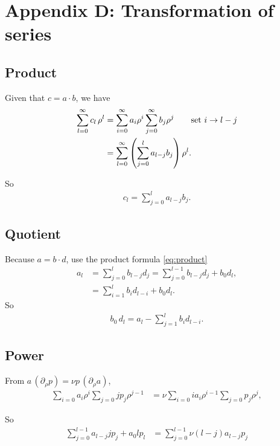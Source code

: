 \documentclass[preprint]{revtex4-1}
\numberwithin{equation}{subsection}
\numberwithin{table}{section}
\begin{document}
\section{Appendix D: Transformation of series}

\subsection{Product}

Given that $c = a \cdot b$, we have
\begin{align*}
  \sum_{l = 0}^{\infty} c_l \, \rho^l
  &=
  \sum_{i = 0}^{\infty} a_i \rho^i
  \sum_{j = 0}^{\infty} b_j \rho^j
  \qquad \mbox{set $i \rightarrow l - j$}
 \notag \\
  &=
  \sum_{l = 0}^{\infty}
  \left(
  \sum_{j = 0}^{l}
    a_{l-j} b_j \right) \rho^l.
\end{align*}

So
\begin{align}
  c_l = \sum_{j = 0}^{l} a_{l-j} b_j.
  \label{eq:product}
\end{align}



\subsection{Quotient}


Because $a = b \cdot d$,
use the product formula \eqref{eq:product}
\begin{align*}
  a_l
  &= \sum_{j = 0}^{l} b_{l-j} d_j
  = \sum_{j = 0}^{l - 1} b_{l - j} d_j + b_0 d_l,
\\
  &= \sum_{i = 1}^{l} b_{i} d_{l - i} + b_0 d_l.
\end{align*}
So
\begin{align*}
  b_0 \, d_l = a_l -\sum_{j = 1}^{l} b_{i} d_{l - i}.
\end{align*}


\subsection{Power}

From $a \, (\partial_\rho p) = \nu p \, (\partial_\rho a)$,
%
\begin{align*}
  \sum_{i = 0} a_i \rho^i
  \sum_{j = 0} j p_j \rho^{j - 1}
&=
  \nu
  \sum_{i = 0} i a_i \rho^{i - 1}
  \sum_{j = 0} p_j \rho^{j},
\end{align*}

So
\begin{align*}
  \sum_{j = 0}^{l-1} a_{l-j} j p_j + a_0 l p_l
&=
  \sum_{j = 0}^{l-1} \nu (l - j) a_{l - j} p_j
\end{align*}
\end{document}

